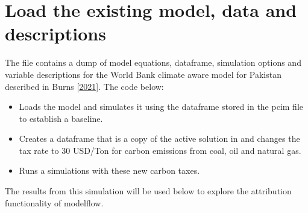 \documentclass[letterpaper,10pt,english]{jupyterBook}
\begin{document}
\section{Load the existing model, data and descriptions}
\label{\detokenize{content/06_ModelAnalytics/AttributionSomeFeatures:load-the-existing-model-data-and-descriptions}}
\sphinxAtStartPar
The file  contains a dump of model equations, dataframe, simulation options and variable descriptions for the World Bank climate aware model for Pakistan described in Burns  {[}\hyperlink{cite.content/99_BackMatter/References:id14}{2021}{]}. The code below:
\begin{itemize}
\item {} 
\sphinxAtStartPar
Loads the model and simulates it using the dataframe stored in the pcim file to establish a baseline.

\item {} 
\sphinxAtStartPar
Creates a dataframe that is a copy of the active solution in  and changes the tax rate to 30 USD/Ton for carbon emissions from coal, oil and natural gas.

\item {} 
\sphinxAtStartPar
Runs a simulations with these new carbon taxes.

\end{itemize}

\sphinxAtStartPar
The results from this simulation will be used below to explore the attribution functionality of modelflow.
\end{document}
